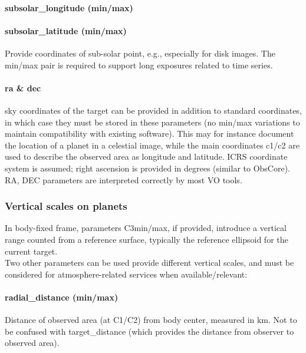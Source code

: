 \documentclass[11pt,a4paper]{ivoa}
\begin{document}
\paragraph{subsolar\_longitude (min/max)}

\paragraph{subsolar\_latitude (min/max)}

Provide coordinates of sub-solar point, e.g., especially for disk images. The min/max pair is required to support long exposures related to time series.

\paragraph{ra \& dec}

sky coordinates of the target can be provided in addition to standard coordinates, in which case they must be stored in these parameters (no min/max variations to maintain compatibility with existing software). This may for instance document the location of a planet in a celestial image, while the main coordinates c1/c2 are used to describe the observed area as longitude and latitude. ICRS coordinate system is assumed; right ascension is provided in degrees (similar to ObsCore). RA, DEC parameters are interpreted correctly by most VO tools.

\subsubsection{Vertical scales on planets}

In body-fixed frame, parameters C3min/max, if provided, introduce a vertical range counted from a reference surface, typically the reference ellipsoid for the current target. \\

Two other parameters can be used provide different vertical scales, and must be considered for atmosphere-related services when available/relevant: \\

\paragraph{radial\_distance (min/max)}

Distance of observed area (at C1/C2) from body center, measured in km. Not to be confused with target\_distance (which provides the distance from observer to observed area). 
\end{document}
